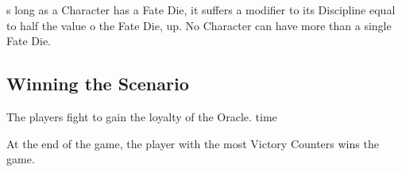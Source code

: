s long as a Character has a Fate Die, it suffers a  modifier to its Discipline equal to half the value o the Fate Die,  up. No Character can have more than a single Fate Die.

\subsection*{Winning the Scenario}

The players fight to gain the loyalty of the Oracle.  time 

At the end of the game, the player with the most Victory Counters wins the game.

